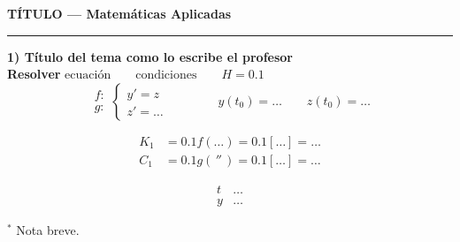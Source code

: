 \documentclass[11pt]{article}
\begin{document}
\begin{center}{\Large\textbf{TÍTULO --- Matemáticas Aplicadas}}\end{center}
\hrule\vspace{8pt}

{\large\textbf{1) Título del tema como lo escribe el profesor}}\\[6pt]
\textbf{Resolver} \quad $\text{ecuación} \qquad \text{condiciones} \qquad H=0.1$\\[4pt]

\[
\begin{array}{r} f:\\[2pt] g:\end{array}\left\{\begin{array}{l} y'=z\\[2pt] z'=\dots\end{array}\right.
\qquad\qquad y(t_0)=\dots \qquad z(t_0)=\dots
\]

\begin{align*}
K_1&=0.1f(\dots)=0.1[\dots]=\dots\\
C_1&=0.1g(\,''\,)=0.1[\dots]=\dots
\end{align*}

\[\boxed{\begin{array}{c|ccc} t & \dots \\\hline y & \dots \end{array}}\]

{\footnotesize $^{*}$ Nota breve.}
\end{document}
